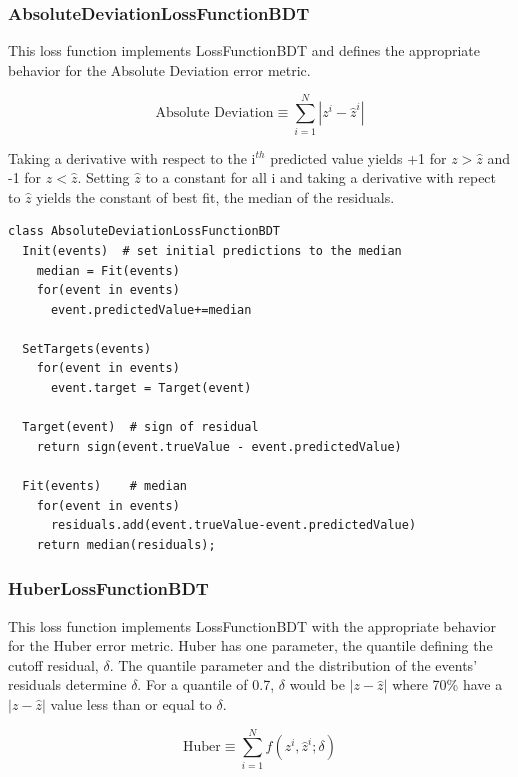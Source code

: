 \documentclass[12pt]{article}
\begin{document}
\subsubsection{AbsoluteDeviationLossFunctionBDT}

This loss function implements LossFunctionBDT and defines the appropriate behavior for the Absolute Deviation error metric.

\begin{equation}
\textrm{Absolute Deviation} \equiv \sum_{i=1}^{N} |z^i-\hat{z}^i|
\end{equation}

Taking a derivative with respect to the i$^{th}$ predicted value yields +1 for $z>\hat{z}$ and -1 for $z<\hat{z}$. Setting $\hat{z}$ to a constant for all i and taking a derivative with repect to $\hat{z}$ yields the constant of best fit, the median of the residuals.    

\begin{verbatim}
class AbsoluteDeviationLossFunctionBDT
  Init(events)  # set initial predictions to the median
    median = Fit(events)
    for(event in events)
      event.predictedValue+=median

  SetTargets(events)  
    for(event in events)  
      event.target = Target(event)

  Target(event)  # sign of residual                 
    return sign(event.trueValue - event.predictedValue)

  Fit(events)    # median                
    for(event in events)
      residuals.add(event.trueValue-event.predictedValue)
    return median(residuals);

\end{verbatim}

\subsubsection{HuberLossFunctionBDT}

This loss function implements LossFunctionBDT with the appropriate behavior for the Huber error metric. Huber has one parameter, the quantile defining the cutoff residual, $\delta$. The quantile parameter and the distribution of the events' residuals determine $\delta$. For a quantile of 0.7, $\delta$ would be $|z-\hat{z}|$ where 70\% have a $|z-\hat{z}|$ value less than or equal to $\delta$.

\begin{equation}
\textrm{Huber} \equiv \sum_{i=1}^{N} f(z^i, \hat{z}^i; \delta)
\end{equation}
\end{document}
